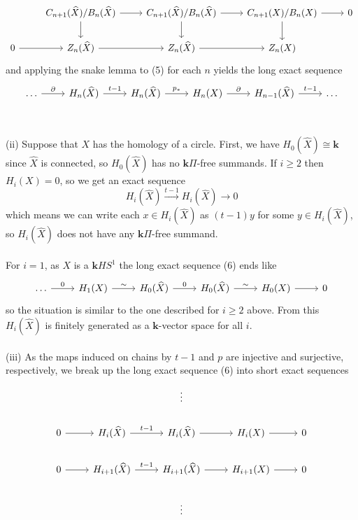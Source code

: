 \documentclass{article}
\begin{document}
\begin{equation}
    \begin{tikzcd}
    &C_{n+1}(\widehat{X})/B_n(\widehat{X}) \ar[d] \ar[r] &C_{n+1}(\widehat{X})/B_n(\widehat{X}) \ar[d] \ar[r] &C_{n+1}(X)/B_n(X) \ar[d] \ar[r] &0 \\
    0 \ar[r] &Z_n(\widehat{X}) \ar[r] &Z_n(\widehat{X}) \ar[r] &Z_n(X)
    \end{tikzcd}
\end{equation}
and applying the snake lemma to (5) for each $n$ yields the long exact sequence 
\begin{equation}
    \begin{tikzcd}
    \hdots \ar[r, "\partial"] &H_n(\widehat{X}) \ar[r, "t-1"] &H_n(\widehat{X}) \ar[r, "p_*"] &H_n(X) \ar[r, "\partial"] &H_{n-1}(\widehat{X}) \ar[r, "t-1"] &\hdots
    \end{tikzcd}
\end{equation}
\\ \\
(ii) Suppose that $X$ has the homology of a circle. First, we have $H_0(\widehat{X}) \cong \textbf{k}$ since $\widehat{X}$ is connected, so $H_0(\widehat{X})$ has no $\textbf{k}\Pi$-free summands. If $i \geq 2$ then $H_i(X) = 0$, so we get an exact sequence 
\[
H_i(\widehat{X}) \xrightarrow{t-1} H_i(\widehat{X}) \to 0
\]
which means we can write each $x \in H_i(\widehat{X})$ as $(t-1)y$ for some $y \in H_i(\widehat{X})$, so $H_i(\widehat{X})$ does not have any $\textbf{k}\Pi$-free summand. \\ \\
For $i=1$, as $X$ is a $\textbf{k}HS^1$ the long exact sequence (6)
ends like 
\[
\begin{tikzcd}
\hdots \ar[r, "0"] &H_1(X) \ar[r, "\sim"] &H_0(\widehat{X}) \ar[r, "0"] &H_0(\widehat{X}) \ar[r, "\sim"] &H_0(X) \ar[r] &0
\end{tikzcd}
\]
so the situation is similar to the one described for $i\geq 2$ above. From this $H_i(\widehat{X})$ is finitely generated as a $\textbf{k}$-vector space for all $i$.
\\ \\
(iii) As the maps induced on chains by $t-1$ and $p$ are injective and surjective, respectively, we break up the long exact sequence (6) into short exact sequences 
\[
\begin{tikzcd}
  &&\vdots  \\
0 \ar[r] &H_i(\widehat{X})  \ar[r, "t-1"] &H_i(\widehat{X}) \ar[r] &H_i(X) \ar[r] &0 \\ 
0 \ar[r] &H_{i+1}(\widehat{X}) \ar[r, "t-1"] &H_{i+1}(\widehat{X}) \ar[r] &H_{i+1}(X) \ar[r] &0 \\
&&\vdots
\end{tikzcd}
\]
\end{document}
